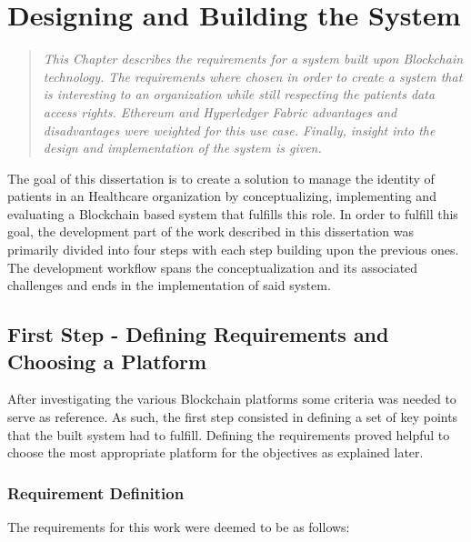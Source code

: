 \chapter{Designing and Building the System} \label{development}

\begin{quote}
\emph{This Chapter describes the requirements for a system built upon
  Blockchain technology. The requirements where chosen in order to create a
  system that is interesting to an organization while still respecting the
  patients data access rights. Ethereum and Hyperledger Fabric advantages and
disadvantages were weighted for this use case. Finally, insight into the design
and implementation of the system is given.} \end{quote}

The goal of this dissertation is to create a solution to manage the identity of
patients in an Healthcare organization by conceptualizing, implementing and
evaluating a Blockchain based system that fulfills this role. In order to
fulfill this goal, the development part of the work described in this
dissertation was primarily divided into four steps with each step building upon
the previous ones. The development workflow spans the conceptualization and its
associated challenges and ends in the implementation of said system.

\section{First Step - Defining Requirements and Choosing a Platform}
\label{choosingHyperledger}

After investigating the various Blockchain platforms some criteria was needed
to serve as reference. As such, the first step consisted in defining a set of
key points that the built system had to fulfill. Defining the requirements
proved helpful to choose the most appropriate platform for the objectives as
explained later.

\subsection{Requirement Definition} 
The requirements for this work were deemed to be as follows:

